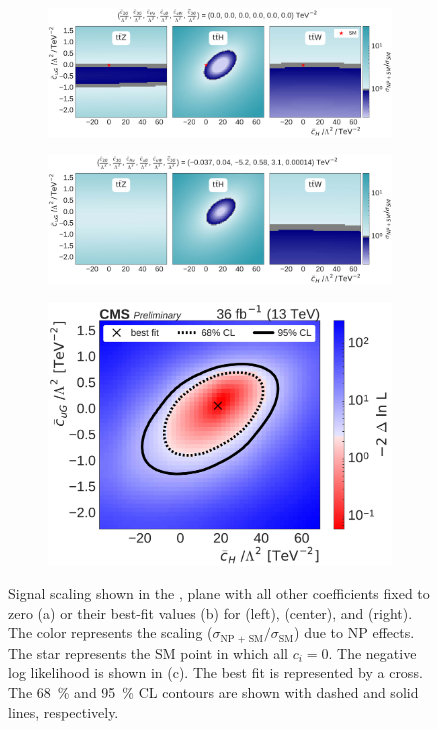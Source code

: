\begin{figure}
  \vspace{-1cm}
  \begin{subfigure}{\linewidth}
    \centering
    \includegraphics[width=\linewidth]{figures/thirteen-TeV/scaling-frozen/cH_cuG}
    \caption{}
  \end{subfigure}
  \begin{subfigure}{\linewidth}
    \centering
    \includegraphics[width=\linewidth]{figures/thirteen-TeV/scaling/cH_cuG}
    \caption{}
  \end{subfigure}
  \begin{subfigure}{\linewidth}
    \centering
    \includegraphics[width=0.6\linewidth]{figures/thirteen-TeV/nll/cH_cuG}
    \caption{}
  \end{subfigure}
  \vspace{-1cm}
  \setlength{\capwidth}{15cm}
  \caption[Signal scaling and profile likelihood scan in the \cH, \cuG plane]{Signal scaling shown
  in the \cH, \cuG plane with all other coefficients fixed to zero (a) or their best-fit values (b)
  for \ttZ (left), \ttH (center), and \ttW (right). The color represents the scaling ($\sigma_\text{NP
  + SM} / \sigma_\text{SM}$) due to NP effects. The star represents the SM point in which all $c_i=0$.
  The negative log likelihood is shown in (c). The best fit is represented by a cross. The
  \SI{68}{\percent} and \SI{95}{\percent} CL contours are shown with dashed and solid lines,
  respectively.}
\end{figure}

